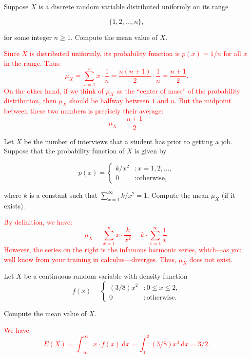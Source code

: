 \documentclass[12pt,reqno]{amsart}
\begin{document}
\bigskip
\prob Suppose $X$ is a discrete random variable distributed uniformly on its range
    
\[\{1,2,\ldots,n\},\]

for some integer $n\geq 1$. Compute the mean value of $X$.

\bigskip
\textcolor{red}{Since $X$ is distributed uniformly, its probability function is $p(x) = 1/n$ for all $x$ in the range. Thus:
    \[\mu_X = \sum_{x=1}^n x\cdot \frac{1}{n} = \frac{n(n+1)}{2} \cdot \frac{1}{n} = \frac{n+1}{2}.\]
On the other hand, if we think of $\mu_X$ as the ``center of mass'' of the probability distribution, then $\mu_X$ should be halfway between $1$ and $n$. But the midpoint between these two numbers is precisely their average:
    \[\mu_X = \frac{n+1}{2}.\]}


\bigskip
\prob Let $X$ be the number of interviews that a student has prior to getting a job. Suppose that the probability function of $X$ is given by

    \[p(x) = \begin{cases}
    k/x^2 & : x=1,2,\ldots, \\
    0 & : \text{otherwise,}
    \end{cases}\]

where $k$ is a constant such that $\sum_{x=1}^\infty k/x^2 = 1$. Compute the mean $\mu_X$ (if it exists).

\bigskip
\textcolor{red}{By definition, we have:
    \[\mu_X = \sum_{x=1}^\infty x\cdot  \frac{k}{x^2} = k\cdot \sum_{x=1}^\infty \frac{1}{x}. \]
However, the series on the right is the infamous harmonic series, which---as you well know from your training in calculus---diverges. Thus, $\mu_X$ does not exist.}

















\bigskip
\prob Let $X$ be a continuous random variable with density function
    \[f(x) = \begin{cases}
        (3/8)x^2 & : 0 \leq x \leq 2, \\
        0 & : \text{otherwise}.
    \end{cases}\]

Compute the mean value of $X$.

\bigskip
\textcolor{red}{We have
    \[E(X) = \int_{-\infty}^\infty x \cdot f(x) \ \text{d}x = \int_0^2 (3/8)x^3 \ \text{d} x = 3/2.\]}
\end{document}
